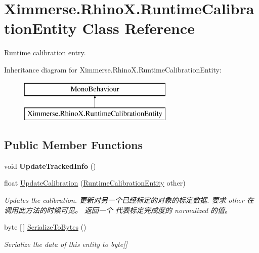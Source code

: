 \hypertarget{class_ximmerse_1_1_rhino_x_1_1_runtime_calibration_entity}{}\section{Ximmerse.\+Rhino\+X.\+Runtime\+Calibration\+Entity Class Reference}
\label{class_ximmerse_1_1_rhino_x_1_1_runtime_calibration_entity}


Runtime calibration entry.  


Inheritance diagram for Ximmerse.\+Rhino\+X.\+Runtime\+Calibration\+Entity\+:\begin{figure}[H]
\begin{center}
\leavevmode
\includegraphics[height=2.000000cm]{class_ximmerse_1_1_rhino_x_1_1_runtime_calibration_entity}
\end{center}
\end{figure}
\subsection*{Public Member Functions}
\begin{DoxyCompactItemize}
\item 
\mbox{\label{class_ximmerse_1_1_rhino_x_1_1_runtime_calibration_entity_a0dc5dfe6c0af4c0f8c079f1542e9fda6}} 
void {\bfseries Update\+Tracked\+Info} ()
\item 
float \mbox{\hyperlink{class_ximmerse_1_1_rhino_x_1_1_runtime_calibration_entity_a788798ab8698e05b46da74e84ebfbf14}{Update\+Calibration}} (\mbox{\hyperlink{class_ximmerse_1_1_rhino_x_1_1_runtime_calibration_entity}{Runtime\+Calibration\+Entity}} other)
\begin{DoxyCompactList}\small\item\em Updates the calibration. 更新对另一个已经标定的对象的标定数据. 要求 other 在调用此方法的时候可见。 返回一个 代表标定完成度的 normalized 的值。 \end{DoxyCompactList}\item 
byte \mbox{[}$\,$\mbox{]} \mbox{\hyperlink{class_ximmerse_1_1_rhino_x_1_1_runtime_calibration_entity_a5d385358e0eba30a11f5ac28c93f495c}{Serialize\+To\+Bytes}} ()
\begin{DoxyCompactList}\small\item\em Serialize the data of this entity to byte\mbox{[}\mbox{]} \end{DoxyCompactList}\end{DoxyCompactItemize}
